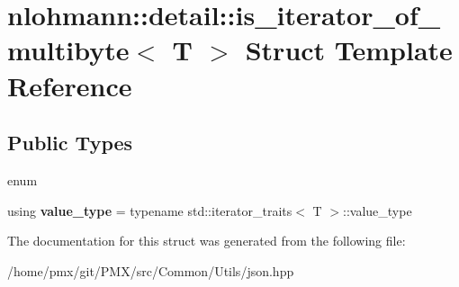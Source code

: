 \hypertarget{structnlohmann_1_1detail_1_1is__iterator__of__multibyte}{}\section{nlohmann\+:\+:detail\+:\+:is\+\_\+iterator\+\_\+of\+\_\+multibyte$<$ T $>$ Struct Template Reference}
\label{structnlohmann_1_1detail_1_1is__iterator__of__multibyte}
\subsection*{Public Types}
\begin{DoxyCompactItemize}
\item 
\mbox{\label{structnlohmann_1_1detail_1_1is__iterator__of__multibyte_aa8a98f3e9f99bbcbe0c907e322f13fb5}} 
enum 
\item 
\mbox{\label{structnlohmann_1_1detail_1_1is__iterator__of__multibyte_a830339a3ad86d82d32a67f9c180523b1}} 
using {\bfseries value\+\_\+type} = typename std\+::iterator\+\_\+traits$<$ T $>$\+::value\+\_\+type
\end{DoxyCompactItemize}


The documentation for this struct was generated from the following file\+:\begin{DoxyCompactItemize}
\item 
/home/pmx/git/\+P\+M\+X/src/\+Common/\+Utils/json.\+hpp\end{DoxyCompactItemize}
